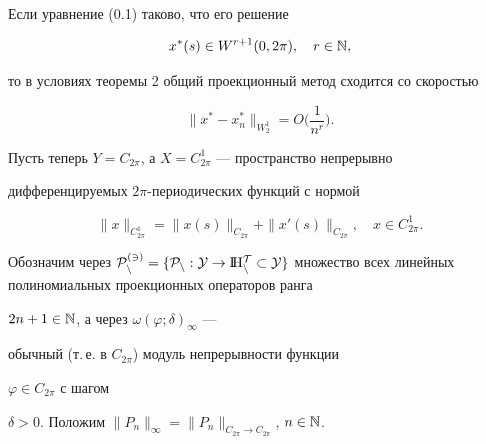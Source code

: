 \begin{cornonum}


Если уравнение (0.1) таково, что его решение


\begin{equation}


x^*(s)\in W^{r+1}(0,2\pi ),\quad r\in \bl{N},


\end{equation}


то в условиях теоремы 2 общий проекционный метод сходится со скоростью


\begin{equation}


\|x^*-x_n^*\|_{{W_2^1}}= O \bigg( \frac{1}{n^r}\bigg) .


\end{equation}


\end{cornonum}





Пусть теперь $Y=C_{2\pi}$, а $X=C_{2\pi}^1$ --- пространство непрерывно


дифференцируемых $2\pi$-периодических функций с нормой


$$


\|x\|_{C_{2\pi}^1}=\|x(s)\|_{C_{2\pi}}+\|x'(s)\|_{C_{2\pi}},


\quad x\in C_{2\pi}^1.


$$


Обозначим через $\rukopis{P}_n^{(3)}=\{\operator{P_n}{Y}{\bll{H}_n^T}\subset


Y\}$ множество всех линейных полиномиальных проекционных операторов ранга


$2n+1\in \Bbb N$, а через $\omega(\varphi ;\delta)_{\infty}$ --- 


обычный (т.\,е. в $C_{2\pi }$) модуль непрерывности функции 


$\varphi\in C_{2\pi}$ с шагом


$\delta >0$. Положим $\|P_n\|_{\infty}=\|P_n\|_{{C_{2\pi}\rightarrow


C_{2\pi}}}$, $n\in \bl{N}$.





